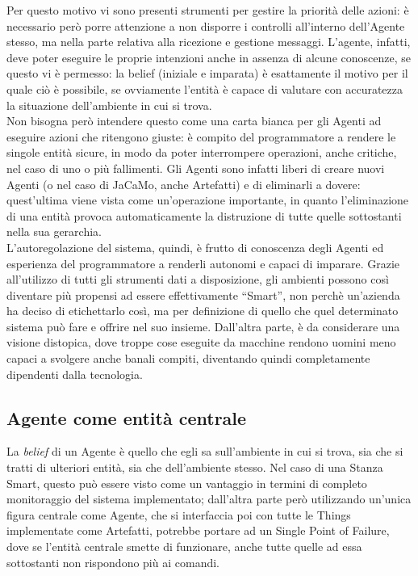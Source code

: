 \documentclass[12pt,a4paper,openright,oneside]{report}
\newcommand{\quotes}[1]{``#1''}
\begin{document}
Per questo motivo vi sono presenti strumenti per gestire la priorità delle azioni: è necessario però porre attenzione a non disporre i controlli all'interno dell'Agente stesso, ma nella parte relativa alla ricezione e gestione messaggi. L'agente, infatti, deve poter eseguire le proprie intenzioni anche in assenza di alcune conoscenze, se questo vi è permesso: la belief (iniziale e imparata) è esattamente il motivo per il quale ciò è possibile, se ovviamente l'entità è capace di valutare con accuratezza la situazione dell'ambiente in cui si trova.\\

Non bisogna però intendere questo come una carta bianca per gli Agenti ad eseguire azioni che ritengono giuste: è compito del programmatore a rendere le singole entità sicure, in modo da poter interrompere operazioni, anche critiche, nel caso di uno o più fallimenti. Gli Agenti sono infatti liberi di creare nuovi Agenti (o nel caso di JaCaMo, anche Artefatti) e di eliminarli a dovere: quest'ultima viene vista come un'operazione importante, in quanto l'eliminazione di una entità provoca automaticamente la distruzione di tutte quelle sottostanti nella sua gerarchia.\\

L'autoregolazione del sistema, quindi, è frutto di conoscenza degli Agenti ed esperienza del programmatore a renderli autonomi e capaci di imparare. Grazie all'utilizzo di tutti gli strumenti dati a disposizione, gli ambienti possono così diventare più propensi ad essere effettivamente \quotes{Smart}, non perchè un'azienda ha deciso di etichettarlo così, ma per definizione di quello che quel determinato sistema può fare e offrire nel suo insieme. Dall'altra parte, è da considerare una visione distopica, dove troppe cose eseguite da macchine rendono uomini meno capaci a svolgere anche banali compiti, diventando quindi completamente dipendenti dalla tecnologia.

\subsection{Agente come entità centrale}
La \textit{belief} di un Agente è quello che egli sa sull'ambiente in cui si trova, sia che si tratti di ulteriori entità, sia che dell'ambiente stesso. Nel caso di una Stanza Smart, questo può essere visto come un vantaggio in termini di completo monitoraggio del sistema implementato; dall'altra parte però utilizzando un'unica figura centrale come Agente, che si interfaccia poi con tutte le Things implementate come Artefatti, potrebbe portare ad un Single Point of Failure, dove se l'entità centrale smette di funzionare, anche tutte quelle ad essa sottostanti non rispondono più ai comandi.\\
\end{document}
